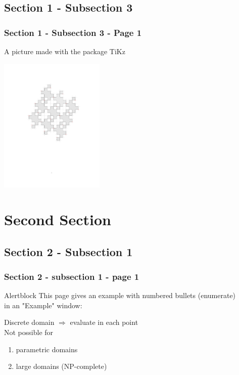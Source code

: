 \documentclass{beamer}
\begin{document}
\subsection{Section 1 - Subsection 3}

\begin{frame}\frametitle{Section 1 - Subsection 3 - Page 1}
	A picture made with the package TiKz\\
	\begin{example}
		\centering
		\includegraphics[width=5cm]{images/abadab-anti-theta-01.pdf}
	\end{example}
\end{frame}

\section{Second Section}

\subsection{Section 2 - Subsection 1}

\begin{frame}\frametitle{Section 2 - subsection 1 - page 1}
	\begin{alertblock}{Alertblock}
		This page gives an example with numbered bullets (enumerate)\\
		in an "Example" window:\\
	\end{alertblock}
	
	\begin{example}
		Discrete domain $\Rightarrow$ evaluate in each point\\
		Not possible for\\
		\begin{enumerate}
			\item <1-> parametric domains
			\item <2-> large domains (NP-complete)
		\end{enumerate}
	\end{example}
\end{frame}
\end{document}
